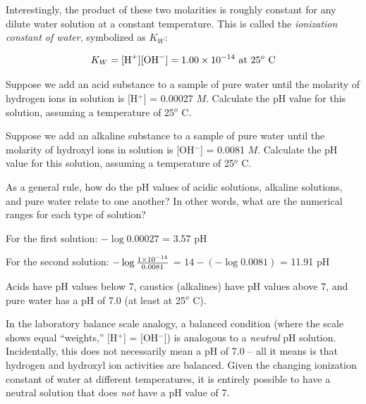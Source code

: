 Interestingly, the product of these two molarities is roughly constant for any dilute water solution at a constant temperature.  This is called the {\it ionization constant of water}, symbolized as $K_W$: 

$$K_W = [\hbox{H}^{+}] [\hbox{OH}^{-}] = 1.00 \times 10^{-14} \hbox{ at } 25^{o} \hbox{ C}$$

\vskip 10pt


\vskip 20pt

Suppose we add an acid substance to a sample of pure water until the molarity of hydrogen ions in solution is [H$^{+}$] = 0.00027 $M$.  Calculate the pH value for this solution, assuming a temperature of 25$^{o}$ C.

\vskip 50pt

Suppose we add an alkaline substance to a sample of pure water until the molarity of hydroxyl ions in solution is [OH$^{-}$] = 0.0081 $M$.  Calculate the pH value for this solution, assuming a temperature of 25$^{o}$ C.

\vskip 50pt

As a general rule, how do the pH values of acidic solutions, alkaline solutions, and pure water relate to one another?  In other words, what are the numerical ranges for each type of solution?







For the first solution: $- \log 0.00027$ = 3.57 pH

\vskip 10pt

For the second solution: $- \log {1 \times 10^{-14} \over 0.0081}$ = $14 - (- \log 0.0081)$ = 11.91 pH

\vskip 10pt

Acids have pH values below 7, caustics (alkalines) have pH values above 7, and pure water has a pH of 7.0 (at least at 25$^{o}$ C).

\vskip 10pt

In the laboratory balance scale analogy, a balanced condition (where the scale shows equal ``weights,'' [H$^{+}$] = [OH$^{-}$]) is analogous to a {\it neutral} pH solution.  Incidentally, this does not necessarily mean a pH of 7.0 -- all it means is that hydrogen and hydroxyl ion activities are balanced.  Given the changing ionization constant of water at different temperatures, it is entirely possible to have a neutral solution that does {\it not} have a pH value of 7.












